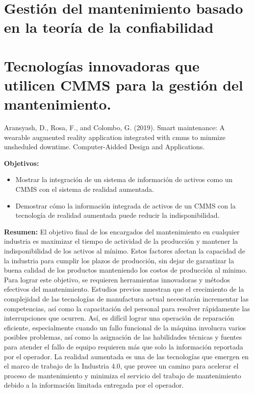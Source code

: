 \section{Gestión del mantenimiento basado en la teoría de la confiabilidad}


\section{Tecnologías innovadoras que utilicen CMMS para la gestión del mantenimiento.}

Aransyash, D., Rosa, F., and Colombo, G. (2019). Smart maintenance: A wearable augmented reality application integrated with cmms to minmize unsheduled downtime. Computer-Aidded Design and Applications.


\begin{description}
\item \textbf{Objetivos:}
\begin{itemize}
\item Mostrar la integración de un sistema de información de activos como un CMMS con el sistema de realidad aumentada.
\item Demostrar cómo la información integrada de activos de un CMMS con la tecnología de realidad aumentada puede reducir la indisponibilidad.
\end{itemize}
\end{description}

\begin{description}
\item \textbf{Resumen:} El objetivo final de los encargados del mantenimiento en cualquier industria es maximizar el tiempo de actividad de la producción y mantener la indisponibilidad de los activos al mínimo. Estos factores afectan la capacidad de la industria para cumplir los plazos de producción, sin dejar de garantizar la buena calidad de los productos manteniendo los costos de producción al mínimo. Para lograr este objetivo, se requieren herramientas innovadoras y métodos efectivos del mantenimiento. Estudios previos muestran que el crecimiento de la complejidad de las tecnologías de manufactura actual necesitarán incrementar las competencias, así como la capacitación del personal para resolver rápidamente las interrupciones que ocurren. Así, es difícil lograr una operación de reparación eficiente, especialmente cuando un fallo funcional de la máquina involucra varios posibles problemas, así como la asignación  de las habilidades técnicas y fuentes para atender el fallo de equipo requieren más que solo la información reportada por el operador. La realidad aumentada es una de las tecnologías que emergen en el marco de trabajo de la Industria 4.0, que provee un camino para acelerar el proceso de mantenimiento y minimiza el servicio del trabajo de mantenimiento debido a la información limitada entregada por el operador.     
\end{description}

